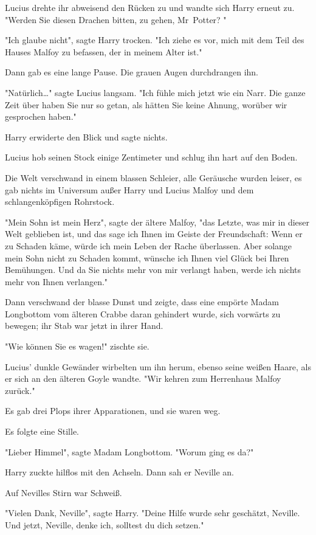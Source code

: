 {Lucius drehte ihr abweisend den Rücken zu und wandte sich Harry erneut zu. "Werden Sie diesen Drachen bitten, zu gehen, Mr~Potter? "

"Ich glaube nicht", sagte Harry trocken. "Ich ziehe es vor, mich mit dem Teil des Hauses Malfoy zu befassen, der in meinem Alter ist."

Dann gab es eine lange Pause. Die grauen Augen durchdrangen ihn.

"Natürlich…" sagte Lucius langsam. "Ich fühle mich jetzt wie ein Narr. Die ganze Zeit über haben Sie nur so getan, als hätten Sie keine Ahnung, worüber wir gesprochen haben."

Harry erwiderte den Blick und sagte nichts.

Lucius hob seinen Stock einige Zentimeter und schlug ihn hart auf den Boden.

Die Welt verschwand in einem blassen Schleier, alle Geräusche wurden leiser, es gab nichts im Universum außer Harry und Lucius Malfoy und dem schlangenköpfigen Rohrstock.

"Mein Sohn ist mein Herz", sagte der ältere Malfoy, "das Letzte, was mir in dieser Welt geblieben ist, und das sage ich Ihnen im Geiste der Freundschaft: Wenn er zu Schaden käme, würde ich mein Leben der Rache überlassen. Aber solange mein Sohn nicht zu Schaden kommt, wünsche ich Ihnen viel Glück bei Ihren Bemühungen. Und da Sie nichts mehr von mir verlangt haben, werde ich nichts mehr von Ihnen verlangen."

Dann verschwand der blasse Dunst und zeigte, dass eine empörte Madam Longbottom vom älteren Crabbe daran gehindert wurde, sich vorwärts zu bewegen; ihr Stab war jetzt in ihrer Hand.

"Wie können Sie es wagen!" zischte sie.

Lucius' dunkle Gewänder wirbelten um ihn herum, ebenso seine weißen Haare, als er sich an den älteren Goyle wandte. "Wir kehren zum Herrenhaus Malfoy zurück."

Es gab drei Plops ihrer Apparationen, und sie waren weg.

Es folgte eine Stille.

"Lieber Himmel", sagte Madam Longbottom. "Worum ging es da?"

Harry zuckte hilflos mit den Achseln. Dann sah er Neville an.

Auf Nevilles Stirn war Schweiß.

"Vielen Dank, Neville", sagte Harry. "Deine Hilfe wurde sehr geschätzt, Neville. Und jetzt, Neville, denke ich, solltest du dich setzen."

}
